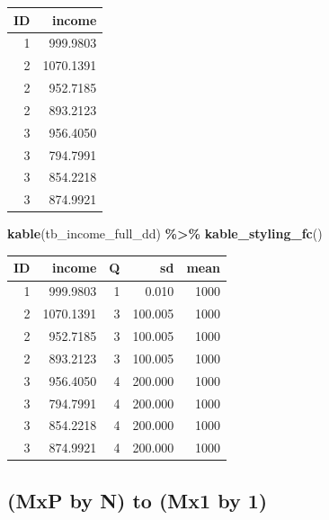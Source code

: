 \documentclass[
]{book}
\newenvironment{Shaded}{\begin{snugshade}}{\end{snugshade}}
\newcommand{\KeywordTok}[1]{\textcolor[rgb]{0.13,0.29,0.53}{\textbf{#1}}}
\newcommand{\NormalTok}[1]{#1}
\newcommand{\OperatorTok}[1]{\textcolor[rgb]{0.81,0.36,0.00}{\textbf{#1}}}
\newcommand{\StringTok}[1]{\textcolor[rgb]{0.31,0.60,0.02}{#1}}
\begin{document}
\begin{table}[!h]
\centering
\begin{tabular}{r|r}
\hline
ID & income\\
\hline
\rowcolor{gray!6}  1 & 999.9803\\
\hline
2 & 1070.1391\\
\hline
\rowcolor{gray!6}  2 & 952.7185\\
\hline
2 & 893.2123\\
\hline
\rowcolor{gray!6}  3 & 956.4050\\
\hline
3 & 794.7991\\
\hline
\rowcolor{gray!6}  3 & 854.2218\\
\hline
3 & 874.9921\\
\hline
\end{tabular}
\end{table}

\begin{Shaded}
\begin{Highlighting}[]
\KeywordTok{kable}\NormalTok{(tb\_income\_full\_dd) }\OperatorTok{\%\textgreater{}\%}
\StringTok{  }\KeywordTok{kable\_styling\_fc}\NormalTok{()}
\end{Highlighting}
\end{Shaded}

\begin{table}[!h]
\centering
\begin{tabular}{r|r|r|r|r}
\hline
ID & income & Q & sd & mean\\
\hline
\rowcolor{gray!6}  1 & 999.9803 & 1 & 0.010 & 1000\\
\hline
2 & 1070.1391 & 3 & 100.005 & 1000\\
\hline
\rowcolor{gray!6}  2 & 952.7185 & 3 & 100.005 & 1000\\
\hline
2 & 893.2123 & 3 & 100.005 & 1000\\
\hline
\rowcolor{gray!6}  3 & 956.4050 & 4 & 200.000 & 1000\\
\hline
3 & 794.7991 & 4 & 200.000 & 1000\\
\hline
\rowcolor{gray!6}  3 & 854.2218 & 4 & 200.000 & 1000\\
\hline
3 & 874.9921 & 4 & 200.000 & 1000\\
\hline
\end{tabular}
\end{table}

\hypertarget{mxp-by-n-to-mx1-by-1}{%
\subsection{(MxP by N) to (Mx1 by 1)}\label{mxp-by-n-to-mx1-by-1}}
\end{document}
